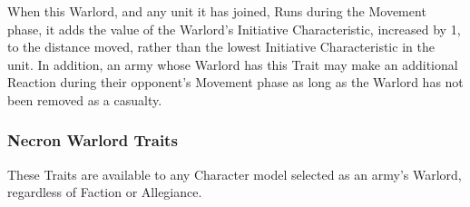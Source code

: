 \begin{multicols}{2}
\vspace*{1em}
When this Warlord, and any unit it has joined, Runs
during the Movement phase, it adds the value of the
Warlord’s Initiative Characteristic, increased by 1, to
the distance moved, rather than the lowest Initiative
Characteristic in the unit. In addition, an army whose
Warlord has this Trait may make an additional Reaction
during their opponent’s Movement phase as long as the
Warlord has not been removed as a casualty.

\end{multicols}

\newpage
\subsubsection{Necron Warlord Traits}
These Traits are available to any Character model selected as an army’s Warlord, regardless of Faction or Allegiance.

